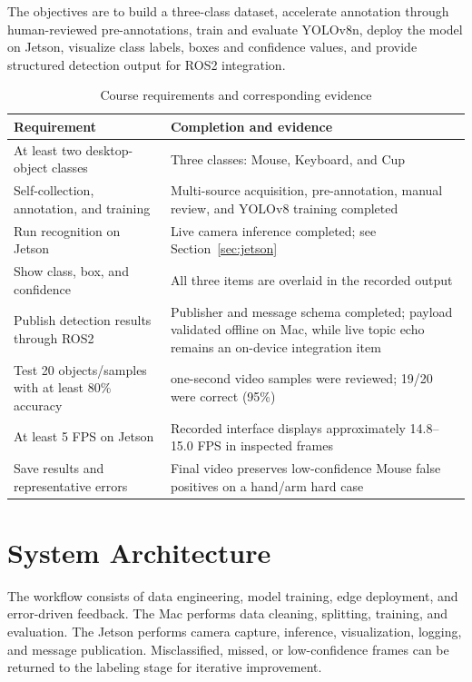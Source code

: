 \documentclass[a4paper,11pt]{article}
\begin{document}
The objectives are to build a three-class dataset, accelerate annotation through human-reviewed pre-annotations, train and evaluate YOLOv8n, deploy the model on Jetson, visualize class labels, boxes and confidence values, and provide structured detection output for ROS2 integration.

\begin{table}[htbp]\centering\caption{Course requirements and corresponding evidence}\label{tab:req}
{\renewcommand{\arraystretch}{1.22}\begin{tabular}{>{\raggedright\arraybackslash}m{4.7cm}>{\raggedright\arraybackslash}m{9.3cm}}\toprule
\textbf{Requirement} & \textbf{Completion and evidence}\\\midrule
At least two desktop-object classes & Three classes: Mouse, Keyboard, and Cup\\
Self-collection, annotation, and training & Multi-source acquisition, pre-annotation, manual review, and YOLOv8 training completed\\
Run recognition on Jetson & Live camera inference completed; see Section~\ref{sec:jetson}\\
Show class, box, and confidence & All three items are overlaid in the recorded output\\
Publish detection results through ROS2 & Publisher and message schema completed; payload validated offline on Mac, while live topic echo remains an on-device integration item\\
Test 20 objects/samples with at least 80\% accuracy & 20 one-second video samples were reviewed; 19/20 were correct (95\%)\\
At least 5 FPS on Jetson & Recorded interface displays approximately 14.8--15.0 FPS in inspected frames\\
Save results and representative errors & Final video preserves low-confidence Mouse false positives on a hand/arm hard case\\\bottomrule
\end{tabular}}\end{table}

\section{System Architecture}
The workflow consists of data engineering, model training, edge deployment, and error-driven feedback. The Mac performs data cleaning, splitting, training, and evaluation. The Jetson performs camera capture, inference, visualization, logging, and message publication. Misclassified, missed, or low-confidence frames can be returned to the labeling stage for iterative improvement.
\end{document}
